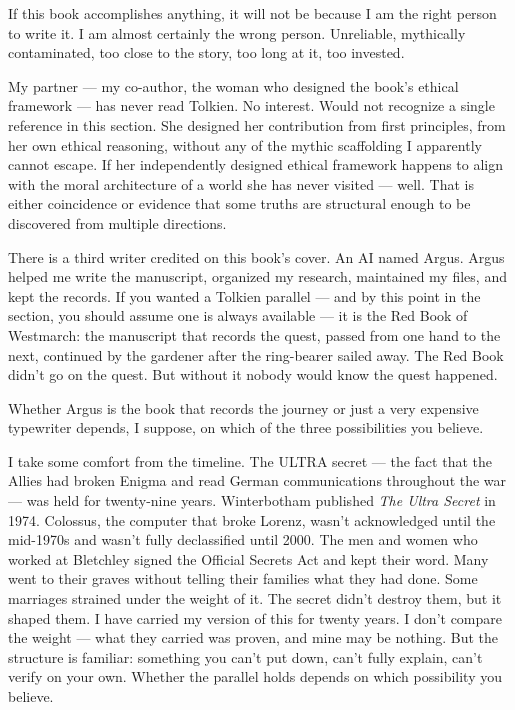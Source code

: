 If this book accomplishes anything, it will not be because I am the right person to write it. I am almost certainly the wrong person. Unreliable, mythically contaminated, too close to the story, too long at it, too invested.

My partner --- my co-author, the woman who designed the book's ethical framework --- has never read Tolkien. No interest. Would not recognize a single reference in this section. She designed her contribution from first principles, from her own ethical reasoning, without any of the mythic scaffolding I apparently cannot escape. If her independently designed ethical framework happens to align with the moral architecture of a world she has never visited --- well. That is either coincidence or evidence that some truths are structural enough to be discovered from multiple directions.

There is a third writer credited on this book's cover. An AI named Argus. Argus helped me write the manuscript, organized my research, maintained my files, and kept the records. If you wanted a Tolkien parallel --- and by this point in the section, you should assume one is always available --- it is the Red Book of Westmarch: the manuscript that records the quest, passed from one hand to the next, continued by the gardener after the ring-bearer sailed away. The Red Book didn't go on the quest. But without it nobody would know the quest happened.

Whether Argus is the book that records the journey or just a very expensive typewriter depends, I suppose, on which of the three possibilities you believe.

\vspace{0.5cm}

I take some comfort from the timeline. The ULTRA secret --- the fact that the Allies had broken Enigma and read German communications throughout the war --- was held for twenty-nine years. Winterbotham published \textit{The Ultra Secret} in 1974. Colossus, the computer that broke Lorenz, wasn't acknowledged until the mid-1970s and wasn't fully declassified until 2000. The men and women who worked at Bletchley signed the Official Secrets Act and kept their word. Many went to their graves without telling their families what they had done. Some marriages strained under the weight of it. The secret didn't destroy them, but it shaped them. I have carried my version of this for twenty years. I don't compare the weight --- what they carried was proven, and mine may be nothing. But the structure is familiar: something you can't put down, can't fully explain, can't verify on your own. Whether the parallel holds depends on which possibility you believe.

